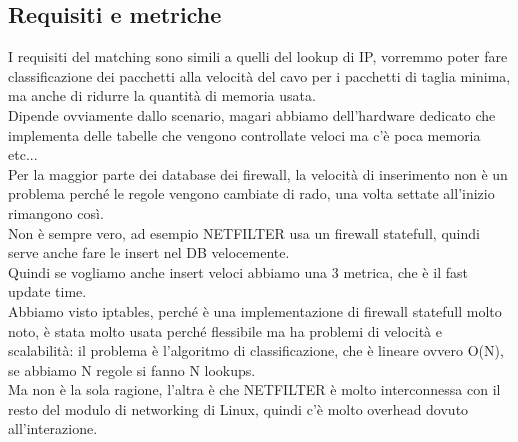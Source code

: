 \documentclass[12pt, oneside]{extbook} %
\begin{document}
\subsection{Requisiti e metriche}
I requisiti del matching sono simili a quelli del lookup di IP, vorremmo poter fare classificazione dei pacchetti alla velocità del cavo per i pacchetti di taglia minima, ma anche di ridurre la quantità di memoria usata.
\\Dipende ovviamente dallo scenario, magari abbiamo dell'hardware dedicato che implementa delle tabelle che vengono controllate veloci ma c'è poca memoria etc...
\\Per la maggior parte dei database dei firewall, la velocità di inserimento non è un problema perché le regole vengono cambiate di rado, una volta settate all'inizio rimangono così.
\\Non è sempre vero, ad esempio NETFILTER usa un firewall statefull, quindi serve anche fare le insert nel DB velocemente.
\\Quindi se vogliamo anche insert veloci abbiamo una 3 metrica, che è il fast update time.
\\Abbiamo visto iptables, perché è una implementazione di firewall statefull molto noto, è stata molto usata perché flessibile ma ha problemi di velocità e scalabilità: il problema è l'algoritmo di classificazione, che è lineare ovvero O(N), se abbiamo N regole si fanno N lookups.
\\Ma non è la sola ragione, l'altra è che NETFILTER è molto interconnessa con il resto del modulo di networking di Linux, quindi c'è molto overhead dovuto all'interazione.
\end{document}
